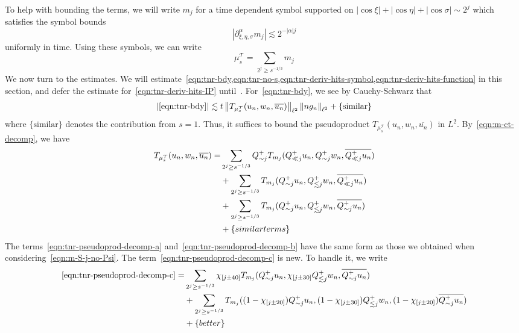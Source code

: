 \documentclass[letterpaper, reqno,final]{amsart}
\newcommand{\cT}{\mathcal{T}}
\newcommand{\btext}[1]{\left\{\textup{#1}\right\}}
\newcommand{\bbetter}{\btext{better}}
\newcommand{\bsim}{\btext{similar terms}}
\begin{document}
To help with bounding the terms, we will write $m_j$ for a time dependent symbol supported on $|\cos \xi| + |\cos \eta| + |\cos \sigma| \sim 2^j$ which satisfies the symbol bounds
\begin{equation*}
    |\partial_{\xi,\eta,\sigma}^\alpha m_j| \lesssim 2^{-|\alpha| j}
\end{equation*}
uniformly in time.  Using these symbols, we can write 
\begin{equation}\label{eqn:m-ct-decomp}
    \mu_s^\cT = \sum_{2^j \geq s^{-1/3}} m_j
\end{equation}
We now turn to the estimates.  We will estimate~\cref{eqn:tnr-bdy,eqn:tnr-no-s,eqn:tnr-deriv-hits-symbol,eqn:tnr-deriv-hits-function} in this section, and defer the estimate for~\eqref{eqn:tnr-deriv-hits-IP} until~.  For~\eqref{eqn:tnr-bdy}, we see by Cauchy-Schwarz that
\begin{equation*}
    \left|\eqref{eqn:tnr-bdy}\right| \lesssim t \left\lVert T_{\mu_s^\cT}(u_n, w_n, \overline{u_n})\right\rVert_{\ell^2} \left\lVert n g_n \right\rVert_{\ell^2} + \{\text{similar}\}
\end{equation*}
where $\{\text{similar}\}$ denotes the contribution from $s = 1$.  Thus, it suffices to bound the pseudoproduct $T_{\mu_s^\cT}(u_n, w_n, \overline{u_n})$ in $L^2$.  By~\eqref{eqn:m-ct-decomp}, we have
\begin{subequations}\begin{align}
    T_{\mu_s^\cT}(u_n, w_n, \overline{u_n}) =&  \sum_{2^j \geq s^{-1/3}} Q^+_{\sim j} T_{m_j}(Q^+_{\ll j} u_n, Q^+_{\sim j} w_n, \overline{Q^+_{\ll j} u_n})\label{eqn:tnr-pseudoprod-decomp-a}\\
    &+ \sum_{2^j \geq s^{-1/3}} T_{m_j}(Q^+_{\sim j} u_n, Q^+_{\lesssim j} w_n, \overline{Q^+_{\ll j} u_n})\label{eqn:tnr-pseudoprod-decomp-b}\\
    &+ \sum_{2^j \geq s^{-1/3}} T_{m_j}(Q^+_{\sim j} u_n, Q^+_{\lesssim j} w_n, \overline{Q^+_{\sim j} u_n})\label{eqn:tnr-pseudoprod-decomp-c}\\
    &+ \bsim\notag
\end{align}\end{subequations}
The terms~\eqref{eqn:tnr-pseudoprod-decomp-a} and~\eqref{eqn:tnr-pseudoprod-decomp-b} have the same form as those we obtained when considering~\eqref{eqn:m-S-j-no-Psi}.  The term~\eqref{eqn:tnr-pseudoprod-decomp-c} is new.  To handle it, we write
\begin{align*}
    \eqref{eqn:tnr-pseudoprod-decomp-c} =& \sum_{2^j \geq s^{-1/3}} \chi_{[j\pm 40]}T_{m_j}(Q^+_{\sim j} u_n, \chi_{[j\pm 30]} Q^+_{\lesssim j} w_n, \overline{Q^+_{\sim j} u_n})\\
    &+ \sum_{2^j \geq s^{-1/3}} T_{m_j}((1-\chi_{[j\pm 20]})Q^+_{\sim j} u_n, (1-\chi_{[j\pm 30]}) Q^+_{\lesssim j} w_n, (1-\chi_{[j\pm 20]})\overline{Q^+_{\sim j} u_n})\\
    &+ \bbetter\notag
\end{align*}
\end{document}
